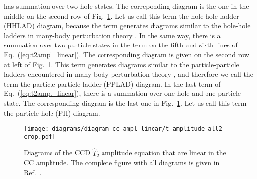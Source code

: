 \documentclass[a4paper,12pt]{report}
\begin{document}
has summation over two hole states. The correponding diagram 
is the one in the middle on the second row of 
Fig.~\ref{fig:t2ampl_linear}. Let us call this term the hole-hole 
ladder (HHLAD) diagram, because the term generates diagrams similar 
to the hole-hole ladders in many-body perturbation theory 
\cite{harris}. In the same way, there is a summation over two 
particle states in the term on the fifth and sixth lines of 
Eq.~(\ref{eq:t2ampl_linear}). The corresponding diagram is given 
on the second row at left of Fig.~\ref{fig:t2ampl_linear}. This 
term generates diagrams similar to the particle-particle ladders 
encountered in many-body perturbation theory \cite{harris}, and 
therefore we call the term the particle-particle ladder (PPLAD) 
diagram. In the last term of Eq.~(\ref{eq:t2ampl_linear}), there 
is a summation over one hole and one particle state. The 
corresponding diagram is the last one in 
Fig.~\ref{fig:t2ampl_linear}. Let us call this term the 
particle-hole (PH) diagram.

\begin{figure} 
  \centering
  \texttt{[image: diagrams/diagram\_cc\_ampl\_linear/t\_amplitude\_all2-crop.pdf]}
  \caption{Diagrams of the CCD $\hat{T}_{2}$ amplitude equation 
that are linear in the CC amplitude. 
The complete figure with all diagrams is given in 
Ref.~\cite{baardsen}.}
  \label{fig:t2ampl_linear}
\end{figure}
\end{document}
